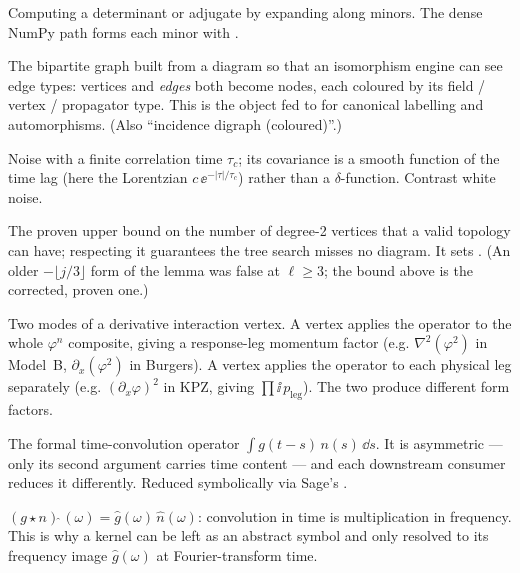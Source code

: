 \begin{description}[leftmargin=0pt,style=nextline]
  \item[Cofactor expansion] Computing a determinant or adjugate by expanding along
        minors. The dense NumPy path forms each minor with .

  \item[Coloured incidence digraph] The bipartite graph built from a diagram so
        that an isomorphism engine can see edge types: vertices and \emph{edges}
        both become nodes, each coloured by its field / vertex / propagator type.
        This is the object fed to  for canonical labelling and
        automorphisms. (Also ``incidence digraph (coloured)''.)

  \item[Colored noise] Noise with a finite correlation time $\tau_c$; its
        covariance is a smooth function of the time lag (here the Lorentzian
        $c\,\ee^{-|\tau|/\tau_c}$) rather than a $\delta$-function. Contrast white
        noise.

  \item[Completeness bound $(k+3\ell-j-1)$] The proven upper bound on the number of
        degree-2 vertices that a valid topology can have; respecting it guarantees
        the tree search misses no diagram. It sets . (An older
        $-\lfloor j/3\rfloor$ form of the lemma was false at $\ell\ge 3$; the
        bound above is the corrected, proven one.)

  \item[Composite vs per-leg vertex] Two modes of a derivative interaction vertex.
        A  vertex applies the operator to the whole
        $\varphi^{n}$ composite, giving a response-leg momentum factor (e.g.
        $\nabla^{2}(\varphi^{2})$ in Model~B, $\partial_x(\varphi^{2})$ in
        Burgers). A  vertex applies the operator to each physical
        leg separately (e.g. $(\partial_x\varphi)^{2}$ in KPZ, giving
        $\prod \ii\,p_{\mathrm{leg}}$). The two produce different form factors.

  \item[Convolution \code{Conv(g, n)}] The formal time-convolution operator
        $\int g(t-s)\,n(s)\,\dd s$. It is asymmetric --- only its second argument
        carries time content --- and each downstream consumer reduces it
        differently. Reduced symbolically via Sage's .

  \item[Convolution theorem] $(g\star n)\widehat{\ }(\omega)=\hat g(\omega)\,\hat
        n(\omega)$: convolution in time is multiplication in frequency. This is why
        a kernel can be left as an abstract symbol and only resolved to its
        frequency image $\hat g(\omega)$ at Fourier-transform time.


\end{description}
